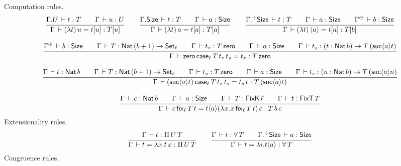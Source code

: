 \documentclass[acmlarge,review,anonymous]{acmart}\settopmatter{printfolios=true}
\begin{document}
Computation rules.
\begin{gather*}
  \ru{\cext \Gamma U \der t : T \qquad
      \Gamma \der u : U
    }{\Gamma \der (\lambda t)\,u = t[u] : T[u]}
\qquad
  \ru{\cext \Gamma \Size \der t : T \qquad
      \Gamma \der a : \Size
    }{\Gamma \der (\lambda t)\,a = t[a] : T[a]}
\qquad
  \ru{\erext \Gamma \Size \der t : T \qquad
      \Gamma \der a : \Size \qquad
      \resurrect \Gamma \der b : \Size
    }{\Gamma \der (\lambda t)\,\ann a = t[a] : T[b]}
\\[2ex]
  \ru{\resurrect\Gamma \der b : \Size \qquad
      \Gamma \der T : \Nat (b + 1) \to \Set[\ell] \qquad
      \Gamma \der t_z : T\,\tzero \qquad
      \Gamma \der a : \Size \qquad
      \Gamma \der t_s : (t : \Nat b) \to T\,(\suc a t)
    }{\Gamma \der \tzero\,\case[\ell] T {t_z} {t_s} = t_z : T\,\tzero}
\\[2ex]
  \ru{\Gamma \der t : \Nat b \qquad
      \Gamma \der T : \Nat (b + 1) \to \Set[\ell] \qquad
      \Gamma \der t_z : T\,\tzero \qquad
      \Gamma \der a : \Size \qquad
      \Gamma \der t_s : (n : \Nat b) \to T\,(\suc a n)
    }{\Gamma \der (\suc a t)\,\case[\ell] T {t_z} {t_s} = t_s\,t : T\,(\suc a t)}
\\[2ex]
  \ru{\Gamma \der c : \Nat b \qquad
      \Gamma \der a : \Size \qquad
      \Gamma \der T : \FixK\,\ell \qquad %
      \Gamma \der t : \FixT\,T %
     }{\Gamma \der c\,\fix[\ell] T t = t\ann a (\lambda x. x\,\fix[\ell] T t)\, c : T \,b \, c
     }%
\end{gather*}
Extensionality rules.
\begin{gather*}
  \ru{\Gamma \der t : \piT U T
    }{\Gamma \der t = \lambda x. t\,x : \piT U T}
\qquad
  \ru{\Gamma \der t : \forallT T \qquad \erext \Gamma \Size \der a : \Size
    }{\Gamma \der t = \lambda i. t \ann a : \forallT T}
\end{gather*}
Congruence rules.
\end{document}
